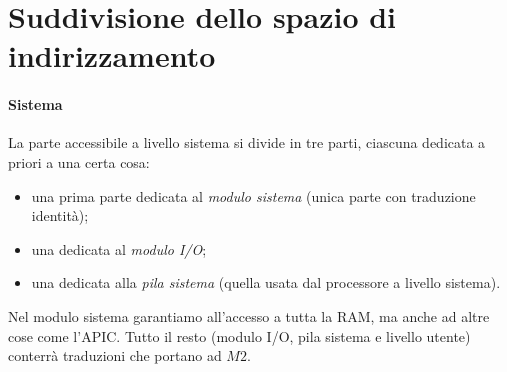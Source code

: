 \documentclass[11pt]{report}
\theoremstyle{definition}
\begin{document}
\clearpage 

\section{Suddivisione dello spazio di indirizzamento}
	\paragraph{Sistema} La parte accessibile a livello sistema si divide in tre parti, ciascuna dedicata a priori a una certa cosa:
	\begin{itemize}
		\item una prima parte dedicata al \textit{modulo sistema} (unica parte con traduzione identità);
		\item una dedicata al \textit{modulo I/O};
		\item una dedicata alla \textit{pila sistema} (quella usata dal processore a livello sistema).
	\end{itemize}
	Nel modulo sistema garantiamo all'accesso a tutta la RAM, ma anche ad altre cose come l'APIC. Tutto il resto (modulo I/O, pila sistema e livello utente) conterrà traduzioni che portano ad $M2$.
\end{document}
